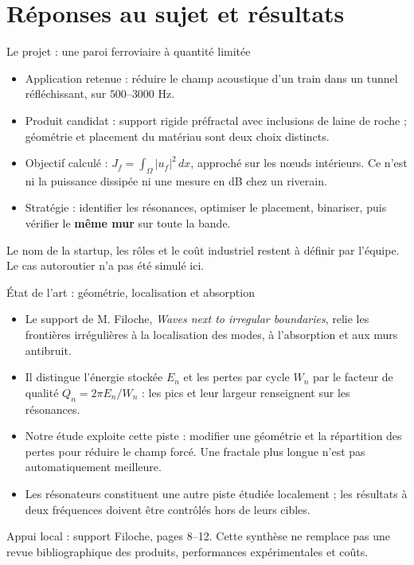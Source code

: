 \section{Réponses au sujet et résultats}

\begin{frame}{Le projet : une paroi ferroviaire à quantité limitée}
\begin{itemize}
\item Application retenue : réduire le champ acoustique d'un train dans un tunnel réfléchissant, sur $500$--$3000$ Hz.
\item Produit candidat : support rigide préfractal avec inclusions de laine de roche ; géométrie et placement du matériau sont deux choix distincts.
\item Objectif calculé : $J_f=\int_\Omega |u_f|^2\,dx$, approché sur les nœuds intérieurs. Ce n'est ni la puissance dissipée ni une mesure en dB chez un riverain.
\item Stratégie : identifier les résonances, optimiser le placement, binariser, puis vérifier le \textbf{même mur} sur toute la bande.
\end{itemize}
\medskip
\small Le nom de la startup, les rôles et le coût industriel restent à définir par l'équipe. Le cas autoroutier n'a pas été simulé ici.
\end{frame}

\begin{frame}{État de l'art : géométrie, localisation et absorption}
\begin{itemize}
\item Le support de M. Filoche, \emph{Waves next to irregular boundaries}, relie les frontières irrégulières à la localisation des modes, à l'absorption et aux murs antibruit.
\item Il distingue l'énergie stockée $E_n$ et les pertes par cycle $W_n$ par le facteur de qualité $Q_n=2\pi E_n/W_n$ : les pics et leur largeur renseignent sur les résonances.
\item Notre étude exploite cette piste : modifier une géométrie et la répartition des pertes pour réduire le champ forcé. Une fractale plus longue n'est pas automatiquement meilleure.
\item Les résonateurs constituent une autre piste étudiée localement ; les résultats à deux fréquences doivent être contrôlés hors de leurs cibles.
\end{itemize}
\medskip
\small Appui local : support Filoche, pages 8--12. Cette synthèse ne remplace pas une revue bibliographique des produits, performances expérimentales et coûts.
\end{frame}

